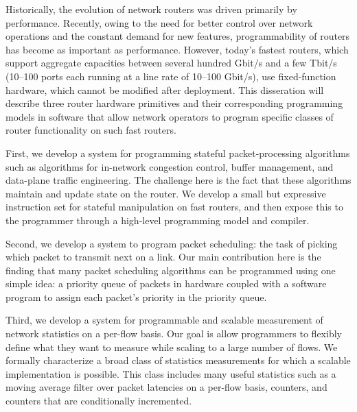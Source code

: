 % 
% 
%
Historically, the evolution of network routers was driven primarily by
performance. Recently, owing to the need for better control over network
operations and the constant demand for new features, programmability of routers
has become as important as performance.  However, today's fastest routers,
which support aggregate capacities between several hundred Gbit/s and a few
Tbit/s (10--100 ports each running at a line rate of 10--100 Gbit/s), use
fixed-function hardware, which cannot be modified after deployment. This
disseration will describe three router hardware primitives and their
corresponding programming models in software that allow network operators to
program specific classes of router functionality on such fast routers.

First, we develop a system for programming stateful packet-processing
algorithms such as algorithms for in-network congestion control, buffer
management, and data-plane traffic engineering. The challenge here is the fact
that these algorithms maintain and update state on the router.  We develop a
small but expressive instruction set for stateful manipulation on fast routers,
and then expose this to the programmer through a high-level programming model
and compiler.

Second, we develop a system to program packet scheduling: the task of picking
which packet to transmit next on a link. Our main contribution here is the
finding that many packet scheduling algorithms can be programmed using one
simple idea: a priority queue of packets in hardware coupled with a software
program to assign each packet's priority in the priority queue.

Third, we develop a system for programmable and scalable measurement of network
statistics on a per-flow basis. Our goal is allow programmers to flexibly
define what they want to measure while scaling to a large number of flows. We
formally characterize a broad class of statistics measurements for which a
scalable implementation is possible. This class includes many useful statistics
such as a moving average filter over packet latencies on a per-flow basis,
counters, and counters that are conditionally incremented.

